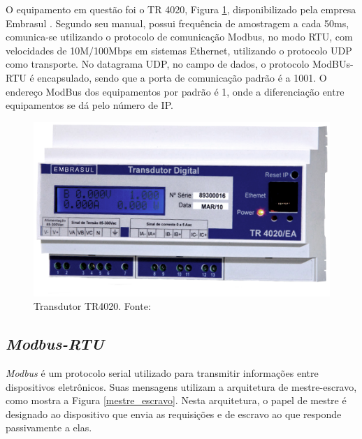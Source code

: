 O equipamento em questão foi o TR 4020, Figura \ref{tr4020}, disponibilizado pela empresa Embrasul \cite{embrasul}. Segundo seu manual, possui frequência de amostragem a cada 50ms, comunica-se utilizando o protocolo de comunicação Modbus, no modo RTU, com velocidades de 10M/100Mbps em sistemas Ethernet, utilizando o protocolo UDP como transporte. No datagrama UDP, no campo de dados, o protocolo ModBUs-RTU é encapsulado, sendo que a porta de comunicação padrão é a 1001. O endereço ModBus dos equipamentos por padrão é 1, onde a diferenciação entre equipamentos se dá pelo número de IP.

\begin{figure}[!h]
    \centering
    \includegraphics[keepaspectratio=true,scale=0.5]{figuras/tr4020.eps}
    \caption{Transdutor TR4020. Fonte: \cite{embrasul}}
    \label{tr4020}
\end{figure}

    \subsection{\textit{Modbus-RTU}}

    \textit{Modbus} \cite{modbus} é um protocolo serial utilizado para transmitir informações entre dispositivos eletrônicos. Suas mensagens utilizam a arquitetura de mestre-escravo, como mostra a Figura \ref{mestre_escravo}. Nesta arquitetura, o papel de mestre é designado ao dispositivo que envia as requisições e de escravo ao que responde passivamente a elas.


